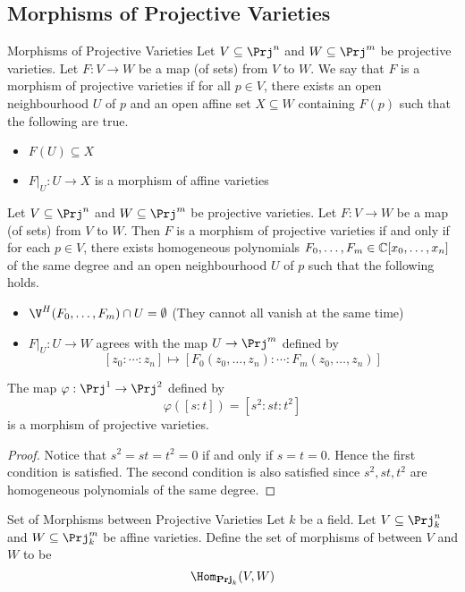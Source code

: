 \documentclass[a4paper]{article}
\begin{document}
\subsection{Morphisms of Projective Varieties}
\begin{defn}{Morphisms of Projective Varieties}{} Let $V\subseteq\Prj^n$ and $W\subseteq\Prj^m$ be projective varieties. Let $F:V\to W$ be a map (of sets) from $V$ to $W$. We say that $F$ is a morphism of projective varieties if for all $p\in V$, there exists an open neighbourhood $U$ of $p$ and an open affine set $X\subseteq W$ containing $F(p)$ such that the following are true. 
\begin{itemize}
\item $F(U)\subseteq X$
\item $F|_U:U\to X$ is a morphism of affine varieties
\end{itemize}
\end{defn}

\begin{prp}{}{} Let $V\subseteq\Prj^n$ and $W\subseteq\Prj^m$ be projective varieties. Let $F:V\to W$ be a map (of sets) from $V$ to $W$. Then $F$ is a morphism of projective varieties if and only if for each $p\in V$, there exists homogeneous polynomials $F_0,\dots,F_m\in\mathbb{C}[x_0,\dots,x_n]$ of the same degree and an open neighbourhood $U$ of $p$ such that the following holds. 
\begin{itemize}
\item $\V^H(F_0,\dots,F_m)\cap U=\emptyset$ (They cannot all vanish at the same time)
\item $F|_U:U\to W$ agrees with the map $U\to\Prj^m$ defined by $$[z_0:\cdots:z_n]\mapsto[F_0(z_0,\dots,z_n):\cdots:F_m(z_0,\dots,z_n)]$$
\end{itemize}
\end{prp}

\begin{eg}{}{} The map $\varphi:\Prj^1\to\Prj^2$ defined by $$\varphi([s:t])=[s^2:st:t^2]$$ is a morphism of projective varieties. 
\begin{proof}
Notice that $s^2=st=t^2=0$ if and only if $s=t=0$. Hence the first condition is satisfied. The second condition is also satisfied since $s^2,st,t^2$ are homogeneous polynomials of the same degree. 
\end{proof}
\end{eg}

\begin{defn}{Set of Morphisms between Projective Varieties}{} Let $k$ be a field. Let $V\subseteq\Prj_k^n$ and $W\subseteq\Prj_k^m$ be affine varieties. Define the set of morphisms of between $V$ and $W$ to be $$\Hom_{\bold{Prj}_k}(V,W)$$
\end{defn}
\end{document}
